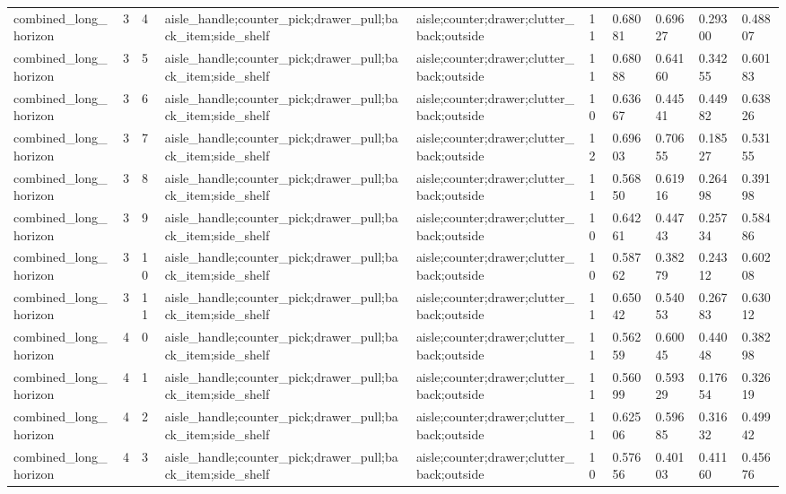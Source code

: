 \documentclass{article}
\begin{document}
\begin{table}[tbp]
{\begin{tabular}{llllllllll}
combined\_long\_horizon & 3 & 4 & aisle\_handle;counter\_pick;drawer\_pull;back\_item;side\_shelf & aisle;counter;drawer;clutter\_back;outside & 11 & 0.68081 & 0.69627 & 0.29300 & 0.48807 \\
combined\_long\_horizon & 3 & 5 & aisle\_handle;counter\_pick;drawer\_pull;back\_item;side\_shelf & aisle;counter;drawer;clutter\_back;outside & 11 & 0.68088 & 0.64160 & 0.34255 & 0.60183 \\
combined\_long\_horizon & 3 & 6 & aisle\_handle;counter\_pick;drawer\_pull;back\_item;side\_shelf & aisle;counter;drawer;clutter\_back;outside & 10 & 0.63667 & 0.44541 & 0.44982 & 0.63826 \\
combined\_long\_horizon & 3 & 7 & aisle\_handle;counter\_pick;drawer\_pull;back\_item;side\_shelf & aisle;counter;drawer;clutter\_back;outside & 12 & 0.69603 & 0.70655 & 0.18527 & 0.53155 \\
combined\_long\_horizon & 3 & 8 & aisle\_handle;counter\_pick;drawer\_pull;back\_item;side\_shelf & aisle;counter;drawer;clutter\_back;outside & 11 & 0.56850 & 0.61916 & 0.26498 & 0.39198 \\
combined\_long\_horizon & 3 & 9 & aisle\_handle;counter\_pick;drawer\_pull;back\_item;side\_shelf & aisle;counter;drawer;clutter\_back;outside & 10 & 0.64261 & 0.44743 & 0.25734 & 0.58486 \\
combined\_long\_horizon & 3 & 10 & aisle\_handle;counter\_pick;drawer\_pull;back\_item;side\_shelf & aisle;counter;drawer;clutter\_back;outside & 10 & 0.58762 & 0.38279 & 0.24312 & 0.60208 \\
combined\_long\_horizon & 3 & 11 & aisle\_handle;counter\_pick;drawer\_pull;back\_item;side\_shelf & aisle;counter;drawer;clutter\_back;outside & 11 & 0.65042 & 0.54053 & 0.26783 & 0.63012 \\
combined\_long\_horizon & 4 & 0 & aisle\_handle;counter\_pick;drawer\_pull;back\_item;side\_shelf & aisle;counter;drawer;clutter\_back;outside & 11 & 0.56259 & 0.60045 & 0.44048 & 0.38298 \\
combined\_long\_horizon & 4 & 1 & aisle\_handle;counter\_pick;drawer\_pull;back\_item;side\_shelf & aisle;counter;drawer;clutter\_back;outside & 11 & 0.56099 & 0.59329 & 0.17654 & 0.32619 \\
combined\_long\_horizon & 4 & 2 & aisle\_handle;counter\_pick;drawer\_pull;back\_item;side\_shelf & aisle;counter;drawer;clutter\_back;outside & 11 & 0.62506 & 0.59685 & 0.31632 & 0.49942 \\
combined\_long\_horizon & 4 & 3 & aisle\_handle;counter\_pick;drawer\_pull;back\_item;side\_shelf & aisle;counter;drawer;clutter\_back;outside & 10 & 0.57656 & 0.40103 & 0.41160 & 0.45676 \\

\end{tabular}}
\end{table}
\end{document}
